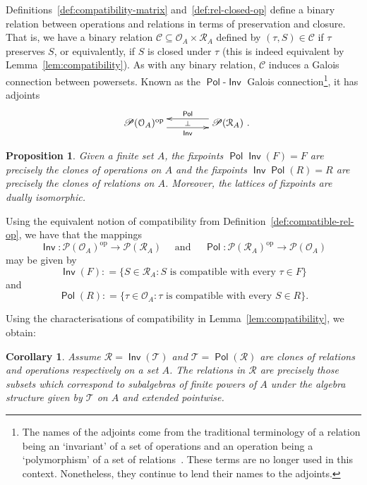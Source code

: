 \documentclass[11pt, a4paper, twoside,leqno]{amsart}
\newcommand{\defeq}{\mathrel{\mathop:}=}
\newcommand{\cd}[2][]{\vcenter{\hbox{\xymatrix#1{#2}}}}
\newcommand{\C}{{\mathcal C}}
\renewcommand{\O}{{\mathcal O}}
\newcommand{\R}{{\mathcal R}}
\numberwithin{equation}{section}
\theoremstyle{plain}
\newtheorem{Prop}[Thm]{Proposition}
\newtheorem{Cor}[Thm]{Corollary}
\theoremstyle{definition}
\DeclareMathOperator{\Pol}{\mathsf{Pol}}
\DeclareMathOperator{\Inv}{\mathsf{Inv}}
\begin{document}
Definitions~\ref{def:compatibility-matrix} and~\ref{def:rel-closed-op}
define a binary relation between operations and relations in terms of
preservation and closure. That is, we have 
a binary relation
\(\C \subseteq \O_{A} \times \R_{A}
\) defined by \((\tau,S) \in \C\) if \(\tau\) preserves \(S\), or
equivalently, if \(S\) is closed under \(\tau\) (this is indeed
equivalent by Lemma~\ref{lem:compatibility}).
As with any binary relation, \(\C\) induces a Galois connection
between powersets. Known as
the \(\Pol\)-\(\Inv\) Galois connection\footnote{The names of the adjoints come from the traditional terminology of a
  relation being an `invariant' of a set of operations and an
  operation being a `polymorphism' of a set of relations~\cite{Kerkhoff:2014aa}. These terms
  are no longer used in this context. Nonetheless, they continue to lend their names to the adjoints. 
}, it has adjoints
\begin{equation*}
  \xymatrixcolsep{3.5pc}
  \xymatrixrowsep{2.5pc}
  \cd{
    {\mathscr{P} (\O_{A})^\mathrm{op}} \ar@<-4.5pt>[r]_-{\Inv} \ar@{<-}@<4.5pt>[r]^-{\Pol} \ar@{}[r]|-{\bot} &
    {\mathscr{P} (\R_{A})
      \rlap{ .}} 
  }
\end{equation*}

\begin{Prop}
  \label{prop:fix-clo-coclo}
  Given a finite
  set
  \(A\), the fixpoints \(\Pol\Inv(F)=F\) are precisely the clones of
  operations on \(A\) and the fixpoints \(\Inv\Pol(R)=R\) are
  precisely the clones of relations on \(A\). Moreover, the lattices
  of fixpoints are dually isomorphic.  
\end{Prop}

Using the equivalent notion of compatibility from Definition~\ref{def:compatible-rel-op}, we have that the mappings 
\begin{equation*}
  \Inv \colon \mathscr{P} (\O_{A})^{\mathrm{op}}  \rightarrow \mathscr{P} (\R_{A}) \quad \text{ and } \quad \Pol \colon \mathscr{P} (\R_{A})^{\mathrm{op}}
  \rightarrow \mathscr{P} 
  (\O_{A})
\end{equation*}
may be given by 
\begin{equation*}
  \Inv(F) \defeq \{S \in \R_{A} : S  \text{ is compatible with every } \tau \in F\} 
\end{equation*}
and
\begin{equation*}
  \Pol(R) \defeq \{ \tau \in \O_{A} : \tau \text{ is compatible with every } S \in R \}.
\end{equation*}

Using the characterisations of compatibility in Lemma~\ref{lem:compatibility}, we obtain:
\begin{Cor}
  \label{cor:compatibility-clone-coclone}
  Assume \(\mathscr{R}
  = \Inv (\mathscr{T}
  )\) and \(\mathscr{T}
  = \Pol (\mathscr{R}
  )\)
  are clones of relations and operations respectively on a set \(A\).
  The relations in \(\mathscr{R}
  \) are precisely those subsets which
  correspond to subalgebras of finite powers of \(A\) under the algebra
  structure given by \(\mathscr{T}
  \) on \(A\) and extended pointwise.
\end{Cor}
\end{document}
